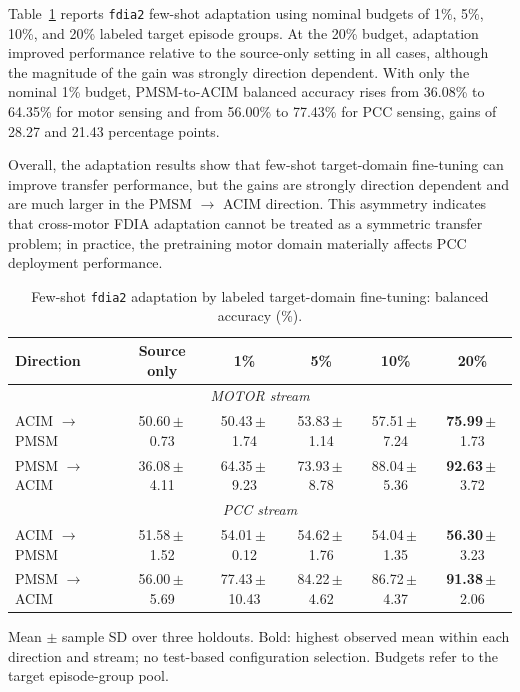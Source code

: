 \documentclass[letterpaper,journal]{IEEEtran}
\begin{document}
Table~\ref{tab:domain_adaptation_anomaly2} reports \texttt{fdia2} few-shot adaptation using nominal budgets of 1\%, 5\%, 10\%, and 20\% labeled target episode groups. At the 20\% budget, adaptation improved performance relative to the source-only setting in all cases, although the magnitude of the gain was strongly direction dependent.
With only the nominal 1\% budget, PMSM-to-ACIM balanced accuracy rises from 36.08\% to 64.35\% for motor sensing and from 56.00\% to 77.43\% for PCC sensing, gains of 28.27 and 21.43 percentage points.

Overall, the adaptation results show that few-shot target-domain fine-tuning can improve transfer performance, but the gains are strongly direction dependent and are much larger in the PMSM $\rightarrow$ ACIM direction. This asymmetry indicates that cross-motor FDIA adaptation cannot be treated as a symmetric transfer problem; in practice, the pretraining motor domain materially affects PCC deployment performance.



\begin{table}[t]
\centering
\footnotesize
\caption{Few-shot \texttt{fdia2} adaptation by labeled target-domain fine-tuning: balanced accuracy (\%).}
\label{tab:domain_adaptation_anomaly2}
\renewcommand{\arraystretch}{1.15}
\setlength{\tabcolsep}{6pt}
\begin{tabular}{@{}lccccc@{}}
\hline
Direction & Source only & 1\% & 5\% & 10\% & 20\% \\\hline
\hline\multicolumn{6}{c}{\textit{MOTOR stream}} \\\hline
ACIM $\to$ PMSM & \mbox{50.60\,$\pm$\,0.73} & \mbox{50.43\,$\pm$\,1.74} & \mbox{53.83\,$\pm$\,1.14} & \mbox{57.51\,$\pm$\,7.24} & \mbox{\textbf{75.99}\,$\pm$\,1.73} \\
PMSM $\to$ ACIM & \mbox{36.08\,$\pm$\,4.11} & \mbox{64.35\,$\pm$\,9.23} & \mbox{73.93\,$\pm$\,8.78} & \mbox{88.04\,$\pm$\,5.36} & \mbox{\textbf{92.63}\,$\pm$\,3.72} \\
\hline\multicolumn{6}{c}{\textit{PCC stream}} \\\hline
ACIM $\to$ PMSM & \mbox{51.58\,$\pm$\,1.52} & \mbox{54.01\,$\pm$\,0.12} & \mbox{54.62\,$\pm$\,1.76} & \mbox{54.04\,$\pm$\,1.35} & \mbox{\textbf{56.30}\,$\pm$\,3.23} \\
PMSM $\to$ ACIM & \mbox{56.00\,$\pm$\,5.69} & \mbox{77.43\,$\pm$\,10.43} & \mbox{84.22\,$\pm$\,4.62} & \mbox{86.72\,$\pm$\,4.37} & \mbox{\textbf{91.38}\,$\pm$\,2.06} \\
\hline\end{tabular}
\par\smallskip\begin{minipage}{\textwidth}\scriptsize Mean $\pm$ sample SD over three holdouts. Bold: highest observed mean within each direction and stream; no test-based configuration selection. Budgets refer to the target episode-group pool.\end{minipage}
\end{table}
\end{document}
